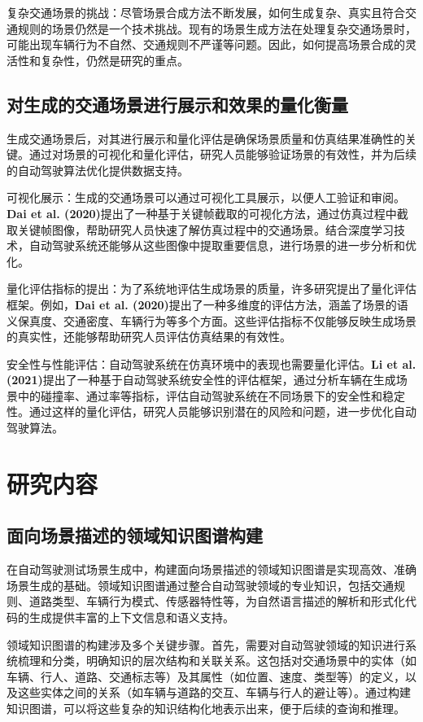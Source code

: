 	复杂交通场景的挑战：尽管场景合成方法不断发展，如何生成复杂、真实且符合交通规则的场景仍然是一个技术挑战。现有的场景生成方法在处理复杂交通场景时，可能出现车辆行为不自然、交通规则不严谨等问题。因此，如何提高场景合成的灵活性和复杂性，仍然是研究的重点。
	
	\subsection{对生成的交通场景进行展示和效果的量化衡量}
	生成交通场景后，对其进行展示和量化评估是确保场景质量和仿真结果准确性的关键。通过对场景的可视化和量化评估，研究人员能够验证场景的有效性，并为后续的自动驾驶算法优化提供数据支持。
	
	可视化展示：生成的交通场景可以通过可视化工具展示，以便人工验证和审阅。\textbf{Dai et al. (2020)}提出了一种基于关键帧截取的可视化方法，通过仿真过程中截取关键帧图像，帮助研究人员快速了解仿真过程中的交通场景。结合深度学习技术，自动驾驶系统还能够从这些图像中提取重要信息，进行场景的进一步分析和优化。
	
	量化评估指标的提出：为了系统地评估生成场景的质量，许多研究提出了量化评估框架。例如，\textbf{Dai et al. (2020)}提出了一种多维度的评估方法，涵盖了场景的语义保真度、交通密度、车辆行为等多个方面。这些评估指标不仅能够反映生成场景的真实性，还能够帮助研究人员评估仿真结果的有效性。
	
	安全性与性能评估：自动驾驶系统在仿真环境中的表现也需要量化评估。\textbf{Li et al. (2021)}提出了一种基于自动驾驶系统安全性的评估框架，通过分析车辆在生成场景中的碰撞率、通过率等指标，评估自动驾驶系统在不同场景下的安全性和稳定性。通过这样的量化评估，研究人员能够识别潜在的风险和问题，进一步优化自动驾驶算法。
	
	\section{研究内容}
	\subsection{面向场景描述的领域知识图谱构建}
	在自动驾驶测试场景生成中，构建面向场景描述的领域知识图谱是实现高效、准确场景生成的基础。领域知识图谱通过整合自动驾驶领域的专业知识，包括交通规则、道路类型、车辆行为模式、传感器特性等，为自然语言描述的解析和形式化代码的生成提供丰富的上下文信息和语义支持。
	
	领域知识图谱的构建涉及多个关键步骤。首先，需要对自动驾驶领域的知识进行系统梳理和分类，明确知识的层次结构和关联关系。这包括对交通场景中的实体（如车辆、行人、道路、交通标志等）及其属性（如位置、速度、类型等）的定义，以及这些实体之间的关系（如车辆与道路的交互、车辆与行人的避让等）。通过构建知识图谱，可以将这些复杂的知识结构化地表示出来，便于后续的查询和推理。
	
